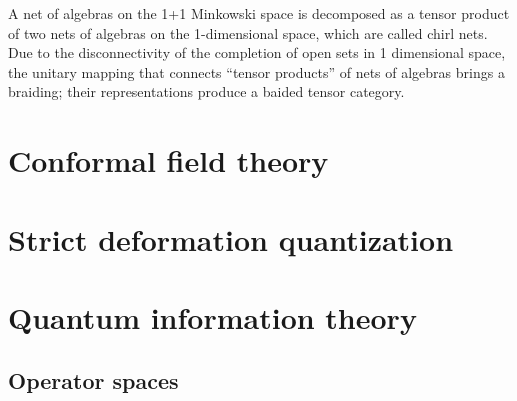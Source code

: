 \documentclass[a4paper]{report}
\begin{document}
A net of algebras on the 1+1 Minkowski space is decomposed as a tensor product of two nets of algebras on the 1-dimensional space, which are called chirl nets.
Due to the disconnectivity of the completion of open sets in 1 dimensional space, the unitary mapping that connects ``tensor products'' of nets of algebras brings a braiding; their representations produce a baided tensor category.



\chapter{Conformal field theory}



\chapter{Strict deformation quantization}






\chapter{Quantum information theory}
\section{Operator spaces}
\end{document}
